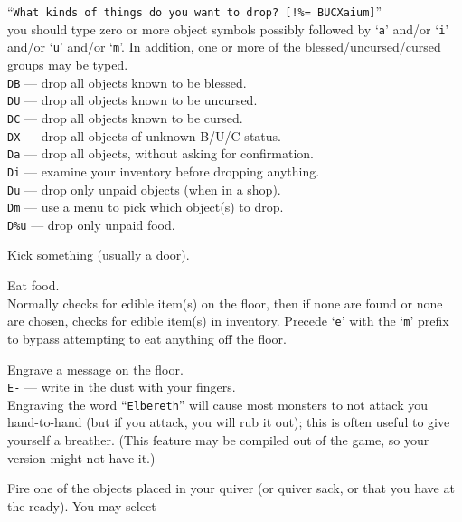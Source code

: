 ``{\tt What kinds of things do you want to drop? [!\%= BUCXaium]}''\\
you should type zero or more object symbols possibly followed by
`{\tt a}' and/or `{\tt i}' and/or `{\tt u}' and/or `{\tt m}'.
In addition, one or more of
the bless\-ed/\-un\-curs\-ed/\-curs\-ed groups may be typed.\\
{\tt DB}  --- drop all objects known to be blessed.\\
{\tt DU}  --- drop all objects known to be uncursed.\\
{\tt DC}  --- drop all objects known to be cursed.\\
{\tt DX}  --- drop all objects of unknown B/U/C status.\\
{\tt Da}  --- drop all objects, without asking for confirmation.\\
{\tt Di}  --- examine your inventory before dropping anything.\\
{\tt Du}  --- drop only unpaid objects (when in a shop).\\
{\tt Dm}  --- use a menu to pick which object(s) to drop.\\
{\tt D\%u} --- drop only unpaid food.
\item[\tb{\^{}D}]
Kick something (usually a door).
\item[\tb{e}]
Eat food.\\
Normally checks for edible item(s) on the floor, then if none are found
or none are chosen, checks for edible item(s) in inventory.
Precede `{\tt e}' with the `{\tt m}' prefix to bypass attempting to eat
anything off the floor.
\item[\tb{E}]
Engrave a message on the floor.\\
{\tt E-} --- write in the dust with your fingers.\\
Engraving the word ``{\tt Elbereth}'' will cause most monsters to not attack
you hand-to-hand (but if you attack, you will rub it out); this is
often useful to give yourself a breather.  (This feature may be compiled out
of the game, so your version might not have it.)
\item[\tb{f}]
Fire one of the objects placed in your quiver (or quiver sack, or that you
have at the ready).  You may select
